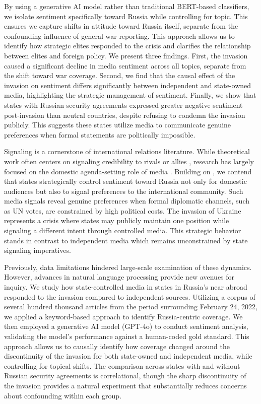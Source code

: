 \documentclass[12pt]{article}
\begin{document}
By using a generative AI model rather than traditional BERT-based classifiers, we isolate sentiment specifically toward Russia while controlling for topic. This ensures we capture shifts in attitude toward Russia itself, separate from the confounding influence of general war reporting. This approach allows us to identify how strategic elites responded to the crisis and clarifies the relationship between elites and foreign policy. We present three findings. First, the invasion caused a significant decline in media sentiment across all topics, separate from the shift toward war coverage. Second, we find that the causal effect of the invasion on sentiment differs significantly between independent and state-owned media, highlighting the strategic management of sentiment. Finally, we show that states with Russian security agreements expressed greater negative sentiment post-invasion than neutral countries, despite refusing to condemn the invasion publicly. This suggests these states utilize media to communicate genuine preferences when formal statements are politically impossible.

Signaling is a cornerstone of international relations literature. While theoretical work often centers on signaling credibility to rivals \citep{fearon_signaling_1997} or allies \citep{blankenship_trivial_2022}, research has largely focused on the domestic agenda-setting role of media \citep{mccombs_agenda-setting_2002}. Building on \citet{cohen_theatre_1987}, we contend that states strategically control sentiment toward Russia not only for domestic audiences but also to signal preferences to the international community. Such media signals reveal genuine preferences when formal diplomatic channels, such as UN votes, are constrained by high political costs. The invasion of Ukraine represents a crisis where states may publicly maintain one position while signaling a different intent through controlled media. This strategic behavior stands in contrast to independent media which remains unconstrained by state signaling imperatives.

Previously, data limitations hindered large-scale examination of these dynamics. However, advances in natural language processing provide new avenues for inquiry. We study how state-controlled media in states in Russia's near abroad responded to the invasion compared to independent sources. Utilizing a corpus of several hundred thousand articles from the period surrounding February 24, 2022, we applied a keyword-based approach to identify Russia-centric coverage. We then employed a generative AI model (GPT-4o) to conduct sentiment analysis, validating the model's performance against a human-coded gold standard. This approach allows us to causally identify how coverage changed around the discontinuity of the invasion for both state-owned and independent media, while controlling for topical shifts. The comparison across states with and without Russian security agreements is correlational, though the sharp discontinuity of the invasion provides a natural experiment that substantially reduces concerns about confounding within each group. %
\end{document}
